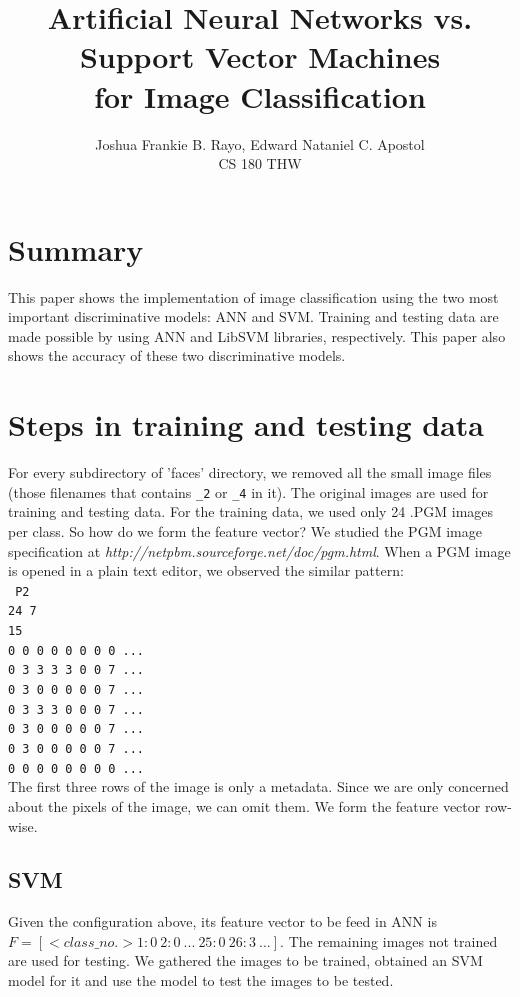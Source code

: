 \documentclass[10pt, twocolumn]{article}
\begin{document}
	\title{Artificial Neural Networks vs. Support Vector Machines\\for Image Classification}
	\author {Joshua Frankie B. Rayo, Edward Nataniel C. Apostol\\CS 180 THW}
	\maketitle
	
	\section{Summary}
	This paper shows the implementation of image classification using the two most important discriminative models: ANN and SVM.
	Training and testing data are made possible by using ANN and LibSVM libraries, respectively.
	This paper also shows the accuracy of these two discriminative models.
	
	\section{Steps in training and testing data}
	For every subdirectory of 'faces' directory, we removed all the small image files (those filenames that contains \texttt{\_2} or \texttt{\_4} in it).
	The original images are used for training and testing data.
	For the training data, we used only 24 .PGM images per class.
	So how do we form the feature vector? We studied the PGM image specification at \textit{http://netpbm.sourceforge.net/doc/pgm.html}.
	When a PGM image is opened in a plain text editor, we observed the similar pattern:\\
	\texttt{
	P2\\
	24 7\\
	15\\
	0  0  0  0  0  0  0  0  ...\\
	0  3  3  3  3  0  0  7  ...\\
	0  3  0  0  0  0  0  7  ...\\
	0  3  3  3  0  0  0  7  ...\\
	0  3  0  0  0  0  0  7  ...\\
	0  3  0  0  0  0  0  7  ...\\
	0  0  0  0  0  0  0  0  ...\\}
	The first three rows of the image is only a metadata.
	Since we are only concerned about the pixels of the image, we can omit them.
	We form the feature vector row-wise.
	
	\subsection{SVM}
	Given the configuration above, its feature vector to be feed in ANN is
	$F = [<class\_no.> 1:0\: 2:0\: ...\: 25:0\: 26:3\: ...]$.
	The remaining images not trained are used for testing.
	We gathered the images to be trained, obtained an SVM model for it and use the model to test the images to be tested.
	
\end{document}
